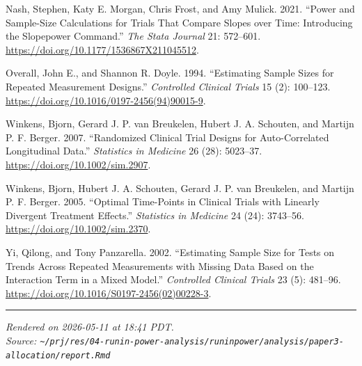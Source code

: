 \documentclass[
  11pt,
]{article}
\newlength{\cslhangindent}
\newenvironment{CSLReferences}[2] %
 {\begin{list}{}{%
  \setlength{\itemindent}{0pt}
  \setlength{\leftmargin}{0pt}
  \setlength{\parsep}{0pt}
  \ifodd #1
   \setlength{\leftmargin}{\cslhangindent}
   \setlength{\itemindent}{-1\cslhangindent}
  \fi
  \setlength{\itemsep}{#2\baselineskip}}}
 {\end{list}}
\begin{document}
\begin{CSLReferences}{1}{1}
Nash, Stephen, Katy E. Morgan, Chris Frost, and Amy Mulick. 2021.
{``Power and Sample-Size Calculations for Trials That Compare Slopes
over Time: Introducing the Slopepower Command.''} \emph{The Stata
Journal} 21: 572--601. \url{https://doi.org/10.1177/1536867X211045512}.

Overall, John E., and Shannon R. Doyle. 1994. {``Estimating Sample Sizes
for Repeated Measurement Designs.''} \emph{Controlled Clinical Trials}
15 (2): 100--123. \url{https://doi.org/10.1016/0197-2456(94)90015-9}.

Winkens, Bjorn, Gerard J. P. van Breukelen, Hubert J. A. Schouten, and
Martijn P. F. Berger. 2007. {``Randomized Clinical Trial Designs for
Auto-Correlated Longitudinal Data.''} \emph{Statistics in Medicine} 26
(28): 5023--37. \url{https://doi.org/10.1002/sim.2907}.

Winkens, Bjorn, Hubert J. A. Schouten, Gerard J. P. van Breukelen, and
Martijn P. F. Berger. 2005. {``Optimal Time-Points in Clinical Trials
with Linearly Divergent Treatment Effects.''} \emph{Statistics in
Medicine} 24 (24): 3743--56. \url{https://doi.org/10.1002/sim.2370}.

Yi, Qilong, and Tony Panzarella. 2002. {``Estimating Sample Size for
Tests on Trends Across Repeated Measurements with Missing Data Based on
the Interaction Term in a Mixed Model.''} \emph{Controlled Clinical
Trials} 23 (5): 481--96.
\url{https://doi.org/10.1016/S0197-2456(02)00228-3}.

\end{CSLReferences}

\vfill

\begin{center}\rule{0.5\linewidth}{0.5pt}\end{center}

\emph{Rendered on 2026-05-11 at 18:41 PDT.}\\
\emph{Source:
\texttt{\textasciitilde{}/prj/res/04-runin-power-analysis/runinpower/analysis/paper3-allocation/report.Rmd}}
\end{document}
